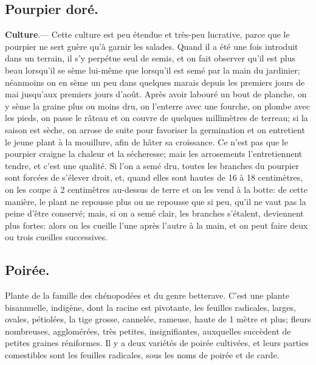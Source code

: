 \documentclass[10pt,a4paper]{book}
\begin{document}
\subsection{Pourpier doré.}

\textbf{Culture}.--- Cette culture est peu étendue et très-peu lucrative, parce que le pourpier ne sert guère qu'à garnir les salades. Quand il a été une fois introduit dans un terrain, il s'y perpétue seul de semis, et on fait observer qu'il est plus beau lorsqu'il se sème lui-même que lorsqu'il est semé par la main du jardinier; néanmoins on en sème un peu dans quelques marais depuis les premiers jours de mai jusqu'aux premiers jours d'août. Après avoir labouré un bout de planche, on y sème la graine plus ou moins dru, on l'enterre avec une fourche, on plombe avec les pieds, on passe le râteau et on couvre de quelques millimètres de terreau; si la saison est sèche, on arrose de suite pour favoriser la germination et on entretient le jeune plant à la mouillure, afin de hâter sa croissance. Ce n'est pas que le pourpier craigne la chaleur et la sécheresse; mais les arrosements l'entretiennent tendre, et c'est une qualité. Si l'on a semé dru, toutes les branches du pourpier sont forcées de s'élever droit, et, quand elles sont hautes de 16 à 18 centimètres, on les coupe à 2 centimètres au-dessus de terre et on les vend à la botte: de cette manière, le plant ne repousse plus ou ne repousse que si peu, qu'il ne vaut pas la peine d'être conservé; mais, si on a semé clair, les branches s'étalent, deviennent plus fortes: alors on les cueille l'une après l'autre à la main, et on peut faire deux ou trois cueilles successives.

\subsection{Poirée.}

Plante de la famille des chénopodées et du genre betterave. C'est une plante bisannuelle, indigène, dont la racine est pivotante, les feuilles radicales, larges, ovales, pétiolées, la tige grosse, cannelée, rameuse, haute de 1 mètre et plus; fleurs nombreuses, agglomérées, très petites, insignifiantes, auxquelles succèdent de petites graines réniformes. Il y a deux variétés de poirée cultivées, et leurs parties comestibles sont les feuilles radicales, sous les noms de poirée et de carde.
\end{document}
